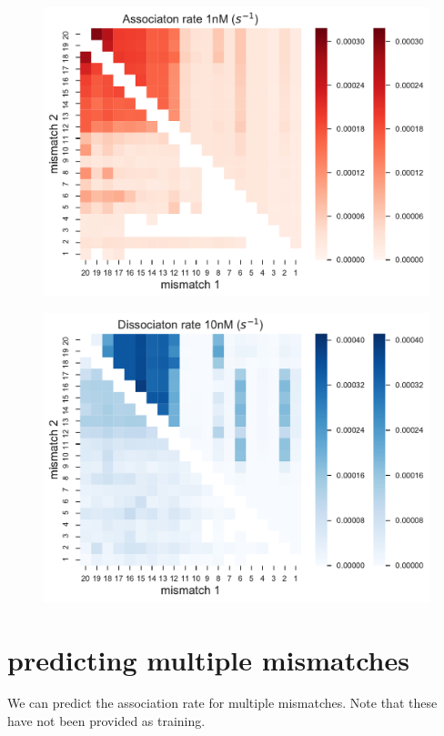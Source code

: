 \documentclass[a4paper,twoside]{revtex4-1}
\begin{document}
\begin{figure}[H]
\includegraphics[scale=0.5]{fig21_10_10_2018.pdf}
\end{figure}

\begin{figure}[H]
\includegraphics[scale=0.5]{fig22_10_10_2018.pdf}
\end{figure}


\section{predicting multiple mismatches}
We can predict the association rate for multiple mismatches. Note that these have not been provided as training.
\end{document}
